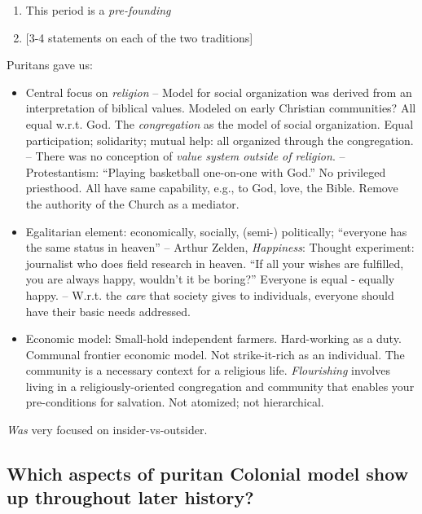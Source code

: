 \documentclass[
]{book}
\begin{document}
\begin{enumerate}
\def\labelenumi{\arabic{enumi}.}
\item
  This period is a \emph{pre-founding}
\item
  {[}3-4 statements on each of the two traditions{]}
\end{enumerate}

Puritans gave us:

\begin{itemize}
\item
  Central focus on \emph{religion}
  -- Model for social organization was derived from an interpretation of biblical values. Modeled on early Christian communities? All equal w.r.t. God. The \emph{congregation} as the model of social organization. Equal participation; solidarity; mutual help: all organized through the congregation.
  -- There was no conception of \emph{value system outside of religion}.
  -- Protestantism: ``Playing basketball one-on-one with God.'' No privileged priesthood. All have same capability, e.g., to God, love, the Bible. Remove the authority of the Church as a mediator.
\item
  Egalitarian element: economically, socially, (semi-) politically; ``everyone has the same status in heaven''
  -- Arthur Zelden, \emph{Happiness}: Thought experiment: journalist who does field research in heaven. ``If all your wishes are fulfilled, you are always happy, wouldn't it be boring?'' Everyone is equal - equally happy.
  -- W.r.t. the \emph{care} that society gives to individuals, everyone should have their basic needs addressed.
\item
  Economic model: Small-hold independent farmers. Hard-working as a duty. Communal frontier economic model. Not strike-it-rich as an individual. The community is a necessary context for a religious life. \emph{Flourishing} involves living in a religiously-oriented congregation and community that enables your pre-conditions for salvation. Not atomized; not hierarchical.
\end{itemize}

\emph{Was} very focused on insider-vs-outsider.

\hypertarget{which-aspects-of-puritan-colonial-model-show-up-throughout-later-history}{%
\subsection{Which aspects of puritan Colonial model show up throughout later history?}\label{which-aspects-of-puritan-colonial-model-show-up-throughout-later-history}}
\end{document}

